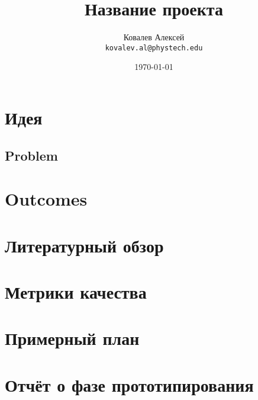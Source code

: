 \documentclass[]{scrartcl}
\title{Название проекта}
\author{\begin{tabular}{c}
	  	 Ковалев Алексей \\
		 \texttt{kovalev.al@phystech.edu} 
		\end{tabular}}
\date{\today}
\begin{document}
\maketitle

\begin{abstract}
\end{abstract}

\section{Идея}

\subsection{Problem}

\section{Outcomes}

\section{Литературный обзор}

\section{Метрики качества}

\section{Примерный план}

\section{Отчёт о фазе прототипирования}



\end{document}
